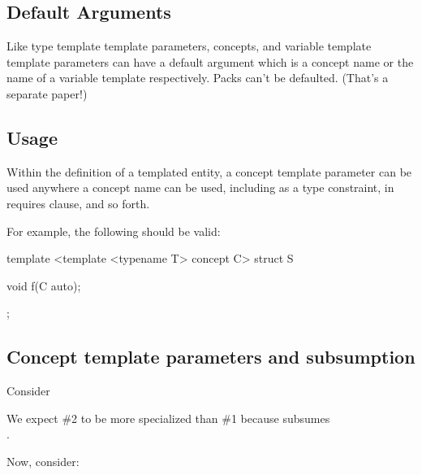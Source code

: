 \documentclass{wg21}
\begin{document}
\subsection{Default Arguments}

Like type template template parameters, concepts, and variable template template
parameters can have a default argument which is a concept name or the name of a variable template respectively.
Packs can't be defaulted. (That's a separate paper!)

\subsection{Usage}

Within the definition of a templated entity, a concept template parameter
can be used anywhere a concept name can be used, including as a type constraint, in requires clause, and so forth.

For example, the following should be valid:

\begin{colorblock}
template <template <typename T> concept C>
struct S {
    void f(C auto);

};
\end{colorblock}

\subsection{Concept template parameters and subsumption}

Consider

We expect \#2 to be more specialized than \#1 because  subsumes\\
.

Now, consider:


\end{document}
